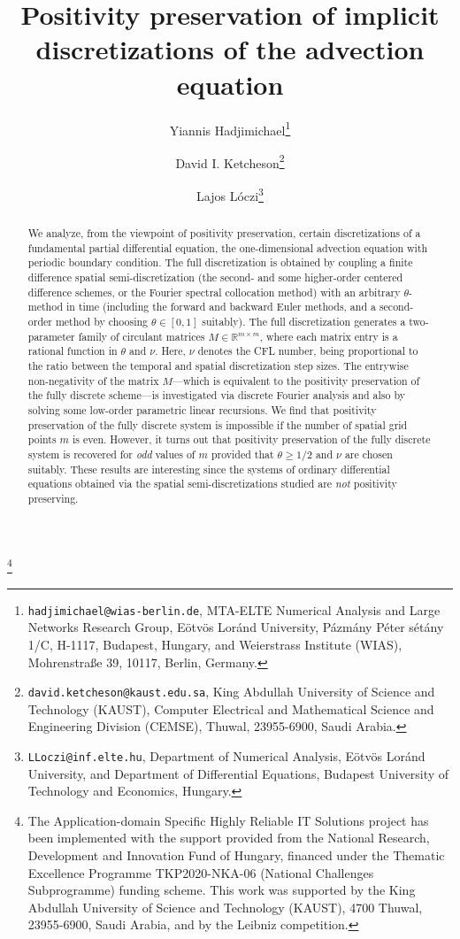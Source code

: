 \documentclass[a4paper]{article}
\title{Positivity preservation of implicit discretizations of the advection equation}
\author{Yiannis Hadjimichael\thanks{{\texttt{hadjimichael@wias-berlin.de}}, MTA-ELTE Numerical
Analysis and Large Networks Research Group, E\"otv\"os Lor\'and University, P\'azm\'any P\'eter
s\'et\'any 1/C, H-1117, Budapest, Hungary, and Weierstrass Institute (WIAS), Mohrenstra{\ss}e 39,
10117, Berlin, Germany.}
\and David I. Ketcheson\thanks{{\texttt{david.ketcheson@kaust.edu.sa}}, King Abdullah University of
Science and Technology (KAUST), Computer Electrical and Mathematical Science and Engineering Division
(CEMSE), Thuwal, 23955-6900, Saudi Arabia.}
\and Lajos L\'oczi\thanks{{\texttt{LLoczi@inf.elte.hu}}, Department of Numerical Analysis, E\"otv\"os
Lor\'and University, and Department of Differential Equations, Budapest University of Technology and
Economics, Hungary.}}
\newcommand{\te}{\theta}
\newcommand\blfootnote[1]{%
  \begingroup
  \renewcommand\thefootnote{}\footnote{#1}%
  \addtocounter{footnote}{-1}%
  \endgroup
}
\begin{document}
\maketitle
\begin{abstract}
We analyze, from the viewpoint of positivity
preservation, certain discretizations of a fundamental partial differential
equation, the one-dimensional advection equation with periodic boundary
condition. The full discretization is obtained by coupling a finite difference spatial semi-discretization 
(the second- and some higher-order centered difference schemes, or the Fourier spectral collocation method)
with an arbitrary $\te$-method in time
(including the forward and backward Euler methods, and a second-order method by
choosing $\te\in [0,1]$ suitably). 
The full discretization generates a
two-parameter family of circulant matrices $M\in\mathbb{R}^{m\times m}$, 
where each matrix entry is a
rational function in $\te$ and $\nu$. Here, $\nu$ denotes the CFL number,
being proportional to the ratio between the temporal and spatial discretization
step sizes. The entrywise non-negativity of the matrix $M$---which is
equivalent to the positivity preservation of the fully discrete
scheme---is investigated via discrete Fourier analysis and also by solving some low-order parametric 
linear recursions. We find that positivity preservation of the fully discrete system is impossible if the number  of spatial grid points $m$ is even. However, it turns out that positivity preservation of the fully discrete system is recovered for \emph{odd} values of $m$
provided that $\te\ge 1/2$ and $\nu$ are chosen suitably. %
These results are interesting since the systems of ordinary differential equations obtained via the spatial semi-discretizations studied are \emph{not} positivity preserving. 
\end{abstract}
\blfootnote{The Application-domain Specific Highly Reliable IT Solutions project  has been implemented with the support provided from the National Research, Development and Innovation Fund of Hungary, financed under the Thematic Excellence Programme TKP2020-NKA-06 (National Challenges Subprogramme) funding scheme.
This work was supported by the King Abdullah University of Science and Technology (KAUST), 4700
Thuwal, 23955-6900, Saudi Arabia, and by the Leibniz competition.}
\end{document}
